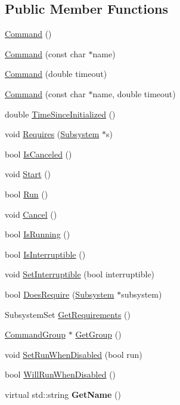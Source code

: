 \subsection*{Public Member Functions}
\begin{DoxyCompactItemize}
\item 
\hyperlink{classCommand_a18df2d81039392daeb0b78c346a70537}{Command} ()
\item 
\hyperlink{classCommand_a1f2fe9a6d3496d00b74b303d7deafbdc}{Command} (const char $\ast$name)
\item 
\hyperlink{classCommand_a1a988669308fd15c9d067ffc44b29f4a}{Command} (double timeout)
\item 
\hyperlink{classCommand_a532edf679f684826aa6b01a1b048fdd4}{Command} (const char $\ast$name, double timeout)
\item 
double \hyperlink{classCommand_a9e73c88648f4bb0f4ea6a4affa72344d}{TimeSinceInitialized} ()
\item 
void \hyperlink{classCommand_abd1739c4b238ca209d98552276247969}{Requires} (\hyperlink{classSubsystem}{Subsystem} $\ast$s)
\item 
bool \hyperlink{classCommand_aa8b9db0daa4b2bcc77f17a6aed08ed18}{IsCanceled} ()
\item 
void \hyperlink{classCommand_ad61704023f2e6acfcfda4bc88c0b77fc}{Start} ()
\item 
bool \hyperlink{classCommand_ae10d99a6cec39f82aa9cb3dc289a45eb}{Run} ()
\item 
void \hyperlink{classCommand_af566114c4b517ef22d8c7820c171b8b2}{Cancel} ()
\item 
bool \hyperlink{classCommand_a2885369af7a278b59c6941b1df23ac86}{IsRunning} ()
\item 
bool \hyperlink{classCommand_ad9ec101c651f2a591bcdebe5db2f0d27}{IsInterruptible} ()
\item 
void \hyperlink{classCommand_abe119aabd648e16fa4ac781a11c8a783}{SetInterruptible} (bool interruptible)
\item 
bool \hyperlink{classCommand_a123a105353e91112a00a838da44901d9}{DoesRequire} (\hyperlink{classSubsystem}{Subsystem} $\ast$subsystem)
\item 
SubsystemSet \hyperlink{classCommand_afb520de2e4173f9342a94dd98d76dc0f}{GetRequirements} ()
\item 
\hyperlink{classCommandGroup}{CommandGroup} $\ast$ \hyperlink{classCommand_af60d2448ba7db9fe4f0d220e9a7df267}{GetGroup} ()
\item 
void \hyperlink{classCommand_afdc73b7597141bd075df8d08c815bb99}{SetRunWhenDisabled} (bool run)
\item 
bool \hyperlink{classCommand_a10193abfc2983232d59461dc12d90a8c}{WillRunWhenDisabled} ()
\item 
\hypertarget{classCommand_a68535903fc61c641f4ab2fdbd11d4257}{
virtual std::string {\bfseries GetName} ()}
\label{classCommand_a68535903fc61c641f4ab2fdbd11d4257}


\end{DoxyCompactItemize}

